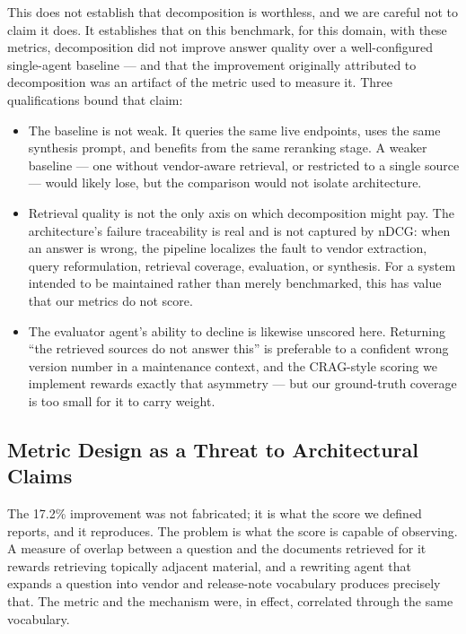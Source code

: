 This does not establish that decomposition is worthless, and we are careful not
to claim it does. It establishes that on this benchmark, for this domain, with
these metrics, decomposition did not improve answer quality over a
well-configured single-agent baseline --- and that the improvement originally
attributed to decomposition was an artifact of the metric used to measure it.
Three qualifications bound that claim:

\begin{itemize}
  \item The baseline is not weak. It queries the same live endpoints, uses the
  same synthesis prompt, and benefits from the same reranking stage. A weaker
  baseline --- one without vendor-aware retrieval, or restricted to a single
  source --- would likely lose, but the comparison would not isolate
  architecture.

  \item Retrieval quality is not the only axis on which decomposition might pay.
  The architecture's failure traceability is real and is not captured by nDCG:
  when an answer is wrong, the pipeline localizes the fault to vendor
  extraction, query reformulation, retrieval coverage, evaluation, or synthesis.
  For a system intended to be maintained rather than merely benchmarked, this
  has value that our metrics do not score.

  \item The evaluator agent's ability to decline is likewise unscored here.
  Returning ``the retrieved sources do not answer this'' is preferable to a
  confident wrong version number in a maintenance context, and the CRAG-style
  scoring we implement rewards exactly that asymmetry --- but our ground-truth
  coverage is too small for it to carry weight.
\end{itemize}

\subsection{Metric Design as a Threat to Architectural Claims}
\label{sec:metric-threat}

The 17.2\% improvement was not fabricated; it is what the score we defined
reports, and it reproduces. The problem is what the score is capable of
observing. A measure of overlap between a question and the documents retrieved
for it rewards retrieving topically adjacent material, and a rewriting agent
that expands a question into vendor and release-note vocabulary produces
precisely that. The metric and the mechanism were, in effect, correlated
through the same vocabulary.


